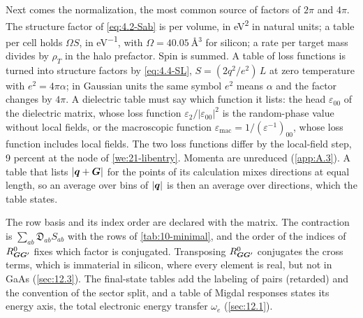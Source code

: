 Next comes the normalization, the most common source of factors of $2\pi$ and $4\pi$. The structure factor of \cref{eq:4.2-Sab} is per volume, in \si{eV^2} in natural units; a table per cell holds $\Omega S$, in \si{eV^{-1}}, with $\Omega = \SI{40.05}{\angstrom^3}$ for silicon; a rate per target mass divides by $\rho_T$ in the halo prefactor. Spin is summed. A table of loss functions is turned into structure factors by \cref{eq:4.4-SL}, $S = (2q^2/e^2)\,L$ at zero temperature with $e^2 = 4\pi\alpha$; in Gaussian units the same symbol $e^2$ means $\alpha$ and the factor changes by $4\pi$. A dielectric table must say which function it lists: the head $\varepsilon_{00}$ of the dielectric matrix, whose loss function $\varepsilon_2/|\varepsilon_{00}|^2$ is the random-phase value without local fields, or the macroscopic function $\varepsilon_{\mathrm{mac}} = 1/(\varepsilon^{-1})_{00}$, whose loss function includes local fields. The two loss functions differ by the local-field step, 9 percent at the node of \cref{we:21-libentry}. Momenta are unreduced (\cref{app:A.3}). A table that lists $|\bm{q} + \bm{G}|$ for the points of its calculation mixes directions at equal length, so an average over bins of $|\bm{q}|$ is then an average over directions, which the table states.

The row basis and its index order are declared with the matrix. The contraction is $\sum_{ab}\mathfrak{D}_{ab}S_{ab}$ with the rows of \cref{tab:10-minimal}, and the order of the indices of $R^0_{\bm{G}\bm{G}'}$ fixes which factor is conjugated. Transposing $R^0_{\bm{G}\bm{G}'}$ conjugates the cross terms, which is immaterial in silicon, where every element is real, but not in GaAs (\cref{sec:12.3}). The final-state tables add the labeling of pairs (retarded) and the convention of the sector split, and a table of Migdal responses states its energy axis, the total electronic energy transfer $\omega_e$ (\cref{sec:12.1}).

